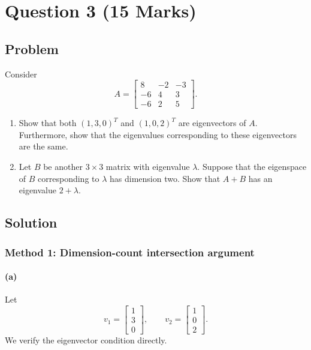 \documentclass[12pt]{article}
\begin{document}
\newpage
\section{Question 3 \hfill (15 Marks)}

\subsection{Problem}
Consider
\[
A=\begin{bmatrix}
8&-2&-3\\
-6&4&3\\
-6&2&5
\end{bmatrix}.
\]
\begin{enumerate}[label=(\alph*)]
  \item Show that both $(1,3,0)^T$ and $(1,0,2)^T$ are eigenvectors of $A$. Furthermore, show that the eigenvalues corresponding to these eigenvectors are the same.
  \item Let $B$ be another $3\times3$ matrix with eigenvalue $\lambda$. Suppose that the eigenspace of $B$ corresponding to $\lambda$ has dimension two. Show that $A+B$ has an eigenvalue $2+\lambda$.
\end{enumerate}

\subsection{Solution}


\subsubsection{Method 1: Dimension-count intersection argument}

\paragraph{(a)}
Let
\[
v_1=\begin{bmatrix}1\\3\\0\end{bmatrix},
\qquad
v_2=\begin{bmatrix}1\\0\\2\end{bmatrix}.
\]
We verify the eigenvector condition directly.
\end{document}
